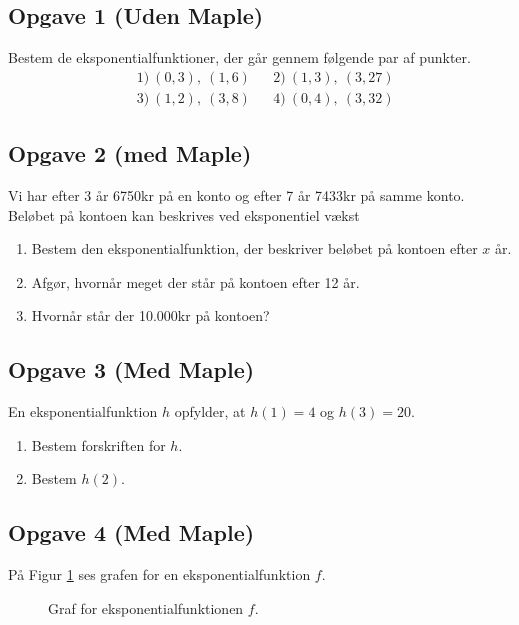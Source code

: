 \subsection*{Opgave 1 (Uden Maple)}
Bestem de eksponentialfunktioner, der går gennem følgende par af punkter.
\begin{align*}
&1) \ (0,3), \ (1,6)  &&2) \ (1,3), \ (3,27)      \\
&3) \ (1,2), \  (3,8)   &&4) \  (0,4), \ (3,32)    
\end{align*}

\subsection*{Opgave 2 (med Maple)}
Vi har efter 3 år 6750kr på en konto og efter 7 år 7433kr på samme konto. Beløbet på kontoen kan beskrives ved eksponentiel vækst
\begin{enumerate}[label=\roman*)]
	\item Bestem den eksponentialfunktion, der beskriver beløbet på kontoen efter $x$ år.
	\item Afgør, hvornår meget der står på kontoen efter 12 år.
	\item Hvornår står der 10.000kr på kontoen?
\end{enumerate}

\subsection*{Opgave 3 (Med Maple)}

En eksponentialfunktion $h$ opfylder, at $h(1) = 4$ og $h(3)  = 20$. 
\begin{enumerate}[label = \roman*)]
	\item Bestem forskriften for $h$.
	\item Bestem $h(2)$.
\end{enumerate}

\subsection*{Opgave 4 (Med Maple)}
På Figur \ref{fig:graf} ses grafen for en eksponentialfunktion $f$.
\begin{figure}[H]
	\centering
	\caption{Graf for eksponentialfunktionen $f$.}
	\label{fig:graf}
\end{figure}

